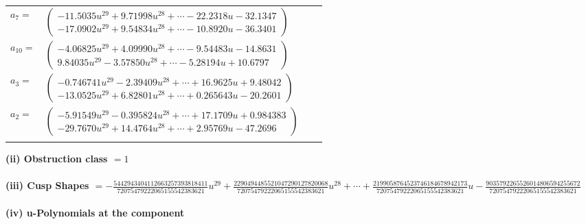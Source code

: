 \documentclass[1p]{elsarticle_modified}
\theoremstyle{definition}
\begin{document}
\begin{tabular}{m{7pt} m{180pt} m{7pt} m{180pt} }
\flushright $a_{7}=$&$\begin{pmatrix}-11.5035 u^{29}+9.71998 u^{28}+\cdots-22.2318 u-32.1347\\-17.0902 u^{29}+9.54834 u^{28}+\cdots-10.8920 u-36.3401\end{pmatrix}$ \\
\flushright $a_{10}=$&$\begin{pmatrix}-4.06825 u^{29}+4.09990 u^{28}+\cdots-9.54483 u-14.8631\\9.84035 u^{29}-3.57850 u^{28}+\cdots-5.28194 u+10.6797\end{pmatrix}$ \\
\flushright $a_{3}=$&$\begin{pmatrix}-0.746741 u^{29}-2.39409 u^{28}+\cdots+16.9625 u+9.48042\\-13.0525 u^{29}+6.82801 u^{28}+\cdots+0.265643 u-20.2601\end{pmatrix}$ \\
\flushright $a_{2}=$&$\begin{pmatrix}-5.91549 u^{29}-0.395824 u^{28}+\cdots+17.1709 u+0.984383\\-29.7670 u^{29}+14.4764 u^{28}+\cdots+2.95769 u-47.2696\end{pmatrix}$\\&\end{tabular}
\flushleft \textbf{(ii) Obstruction class $= 1$}\\~\\
\flushleft \textbf{(iii) Cusp Shapes $= -\frac{5442943404112663257393818411}{72075479222065155542383621} u^{29}+\frac{2290494485521047290127820068}{72075479222065155542383621} u^{28}+\cdots+\frac{2199058764523746184678942173}{72075479222065155542383621} u-\frac{9035792265526014806594255672}{72075479222065155542383621}$}\\~\\
\newpage\renewcommand{\arraystretch}{1}
\flushleft \textbf{(iv) u-Polynomials at the component}\newline \\
\end{document}
